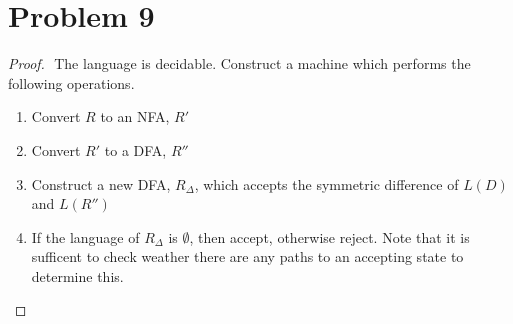 \documentclass{article}
\newenvironment{problem}[1]{
  \nobreak\section*{Problem #1}
}{}
\begin{document}
  \begin{problem}{9}
    \begin{proof}
      $ $\newline
      The language is decidable.  Construct a machine which performs
      the following operations.

      \begin{enumerate}
        \item Convert $R$ to an NFA, $R'$
        \item Convert $R'$ to a DFA, $R''$
        \item Construct a new DFA, $R_\Delta$, which accepts the symmetric difference of $L(D)$ and $L(R'')$
        \item If the language of $R_\Delta$ is $\emptyset$, then accept, otherwise reject.  Note that it is sufficent to check weather there are any paths to an accepting state to determine this.
      \end{enumerate}
    \end{proof}
  \end{problem}
\end{document}
